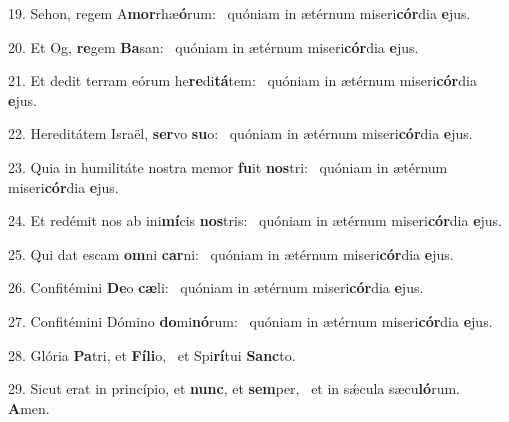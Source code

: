19. Sehon, regem A\textbf{mor}rhæ\textbf{ó}rum: \ast\  quóniam in ætérnum miseri\textbf{cór}dia \textbf{e}jus.\

20. Et Og, \textbf{re}gem \textbf{Ba}san: \ast\  quóniam in ætérnum miseri\textbf{cór}dia \textbf{e}jus.\

21. Et dedit terram eórum he\textbf{re}di\textbf{tá}tem: \ast\  quóniam in ætérnum miseri\textbf{cór}dia \textbf{e}jus.\

22. Hereditátem Israël, \textbf{ser}vo \textbf{su}o: \ast\  quóniam in ætérnum miseri\textbf{cór}dia \textbf{e}jus.\

23. Quia in humilitáte nostra memor \textbf{fu}it \textbf{nos}tri: \ast\  quóniam in ætérnum miseri\textbf{cór}dia \textbf{e}jus.\

24. Et redémit nos ab ini\textbf{mí}cis \textbf{nos}tris: \ast\  quóniam in ætérnum miseri\textbf{cór}dia \textbf{e}jus.\

25. Qui dat escam \textbf{om}ni \textbf{car}ni: \ast\  quóniam in ætérnum miseri\textbf{cór}dia \textbf{e}jus.\

26. Confitémini \textbf{De}o \textbf{cæ}li: \ast\  quóniam in ætérnum miseri\textbf{cór}dia \textbf{e}jus.\

27. Confitémini Dómino \textbf{do}mi\textbf{nó}rum: \ast\  quóniam in ætérnum miseri\textbf{cór}dia \textbf{e}jus.\

28. Glória \textbf{Pa}tri, et \textbf{Fí}\textbf{li}o, \ast\  et Spi\textbf{rí}tui \textbf{Sanc}to.\

29. Sicut erat in princípio, et \textbf{nunc}, et \textbf{sem}per, \ast\  et in sǽcula sæcu\textbf{ló}rum. \textbf{A}men.\

